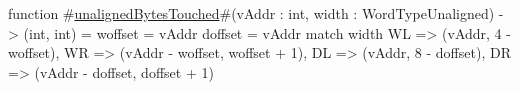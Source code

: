 function #\hyperref[sailMIPSzunalignedBytesTouched]{unalignedBytesTouched}#(vAddr : int, width : WordTypeUnaligned) -> (int, int) = {
  woffset = vAddr %
  doffset = vAddr %
  match width {
    WL => (vAddr, 4 - woffset),
    WR => (vAddr - woffset, woffset + 1),
    DL => (vAddr, 8 - doffset),
    DR => (vAddr - doffset, doffset + 1)
  }
}
